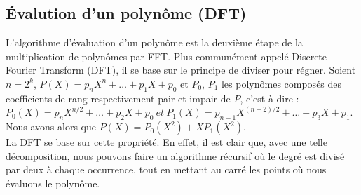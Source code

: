 \documentclass[12pt, a4paper]{article}
\begin{document}
\newpage

\subsection{Évalution d'un polynôme (DFT)}
\label{DFT}
L'algorithme d'évaluation d'un polynôme est la deuxième étape de la multiplication de polynômes par FFT. Plus communément appelé Discrete Fourier Transform (DFT), il se base sur le principe de diviser pour régner.
Soient $n = 2^k$, $P(X) = p_n X^n +\dots+p_1 X + p_0$ et $P_0$, $P_1$ les polynômes composés des coefficients de rang respectivement pair et impair de $P$, c'est-à-dire : \\
$P_0(X) = p_{n} X^{n/2} +\dots+ p_2 X + p_0\ et\ P_1(X) = p_{n-1} X^{(n-2)/2} +\dots+ p_3 X + p_1$. \\
Nous avons alors que $P(X) = P_0(X^2)+X P_1(X^2)$. \\
La DFT se base sur cette propriété. En effet, il est clair que, avec une telle décomposition, nous pouvons faire un algorithme récursif où le degré est divisé par deux à chaque occurrence, tout en mettant au carré les points où nous évaluons le polynôme.\\
\end{document}
